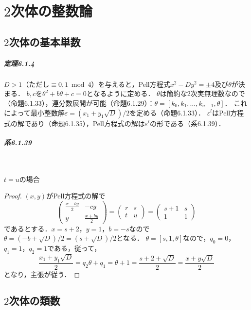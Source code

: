 \chapter{$2$次体の整数論}
\section{$2$次体の基本単数}
\paragraph{定理6.1.4}
$D>1$（ただし$\equiv 0, 1 \bmod 4$）を与えると，Pell方程式$x^2-Dy^2=\pm4$及び$\theta$が決まる．
$b,c$を$\theta^2+b\theta+c=0$となるように定める．
$\theta$は簡約な$2$次実無理数なので（命題6.1.33），連分数展開が可能（命題6.1.29）：$\theta=[k_0,k_1,\ldots,k_{n-1},\theta]$．
これによって最小整数解$\varepsilon = (x_1 + y_1\sqrt{D})/2$を定める（命題6.1.33）．
$\varepsilon^l$はPell方程式の解であり（命題6.1.35），Pell方程式の解は$\varepsilon^l$の形である（系6.1.39）．

\paragraph{系6.1.39}~
\begin{screen}
  $t=u$の場合
\end{screen}
\begin{proof}
  $(x, y)$がPell方程式の解で
  \[
  \begin{pmatrix}
    \frac{x-by}{2} & -cy \\
    y & \frac{x+by}{2}
  \end{pmatrix}
  =
  \begin{pmatrix}
    r & s \\
    t & u
  \end{pmatrix}
  =
  \begin{pmatrix}
    s+1 & s \\
    1 & 1
  \end{pmatrix}
  \]
  であるとする．$x=s+2$，$y=1$，$b=-s$なので$\theta=(-b+\sqrt{D})/2=(s+\sqrt{D})/2$となる．
  $\theta=[s,1,\theta]$なので，$q_0=0$，$q_1=1$，$q_2=1$である，従って，
  \[\frac{x_1+y_1\sqrt{D}}{2} = q_2\theta + q_1 = \theta + 1 = \frac{s+2+\sqrt{D}}{2} = \frac{x+y\sqrt{D}}{2}\]
  となり，主張が従う．
\end{proof}

\section{$2$次体の類数}
